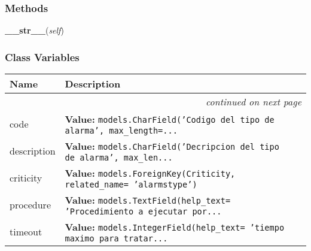   \subsubsection{Methods}

    \label{GroundSegment:models:Alarm:AlarmType:AlarmType:__str__}

    \vspace{0.5ex}

\hspace{.8\funcindent}\begin{boxedminipage}{\funcwidth}

    \raggedright \textbf{\_\_str\_\_}(\textit{self})

\setlength{\parskip}{2ex}
\setlength{\parskip}{1ex}
    \end{boxedminipage}



  \subsubsection{Class Variables}

    \vspace{-1cm}
\hspace{\varindent}\begin{longtable}{|p{\varnamewidth}|p{\vardescrwidth}|l}
\cline{1-2}
\cline{1-2} \centering \textbf{Name} & \centering \textbf{Description}& \\
\cline{1-2}
\endhead\cline{1-2}\multicolumn{3}{r}{\small\textit{continued on next page}}\\\endfoot\cline{1-2}
\endlastfoot\raggedright c\-o\-d\-e\- & \raggedright \textbf{Value:} 
{\tt models.CharField('Codigo del tipo de alarma', max\_length=\texttt{...}}&\\
\cline{1-2}
\raggedright d\-e\-s\-c\-r\-i\-p\-t\-i\-o\-n\- & \raggedright \textbf{Value:} 
{\tt models.CharField('Decripcion del tipo de alarma', max\_len\texttt{...}}&\\
\cline{1-2}
\raggedright c\-r\-i\-t\-i\-c\-i\-t\-y\- & \raggedright \textbf{Value:} 
{\tt models.ForeignKey(Criticity, related\_name= 'alarmstype')}&\\
\cline{1-2}
\raggedright p\-r\-o\-c\-e\-d\-u\-r\-e\- & \raggedright \textbf{Value:} 
{\tt models.TextField(help\_text= 'Procedimiento a ejecutar por\texttt{...}}&\\
\cline{1-2}
\raggedright t\-i\-m\-e\-o\-u\-t\- & \raggedright \textbf{Value:} 
{\tt models.IntegerField(help\_text= 'tiempo maximo para tratar\texttt{...}}&\\
\cline{1-2}
\end{longtable}

